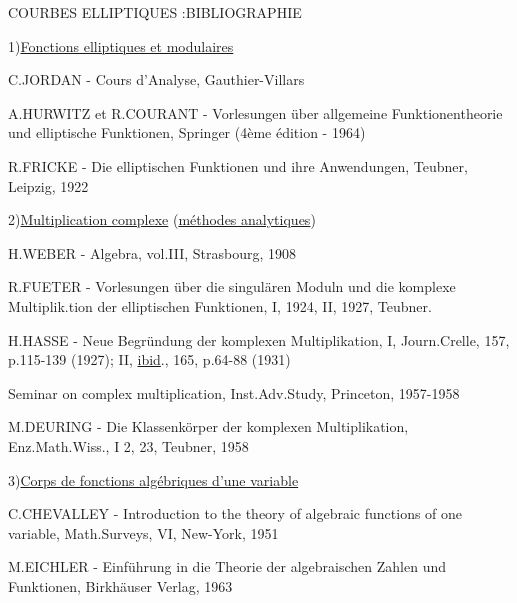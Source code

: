 \clearpage
{}
\reversemarginpar
{}
\normalmarginpar
{}

\begin{center}
COURBES ELLIPTIQUES :\quad BIBLIOGRAPHIE
\end{center}

1)\quad \uline{Fonctions elliptiques et modulaires}

C.JORDAN - Cours d'Analyse, Gauthier-Villars

A.HURWITZ et R.COURANT - Vorlesungen über allgemeine Funktionentheorie und elliptische Funktionen, Springer (4ème édition - 1964)

R.FRICKE - Die elliptischen Funktionen und ihre Anwendungen, Teubner, Leipzig, 1922

2)\quad \uline{Multiplication complexe} (\uline{méthodes analytiques})

H.WEBER - Algebra, vol.III, Strasbourg, 1908

R.FUETER - Vorlesungen über die singulären Moduln und die komplexe Multiplik.tion der elliptischen Funktionen, I, 1924, II, 1927, Teubner.

H.HASSE - Neue Begründung der komplexen Multiplikation, I, Journ.Crelle, 157, p.115-139 (1927); II, \uline{ibid}., 165, p.64-88 (1931)

Seminar on complex multiplication, Inst.Adv.Study, Princeton, 1957-1958

M.DEURING - Die Klassenkörper der komplexen Multiplikation, Enz.Math.Wiss., I 2, 23, Teubner, 1958

3)\quad \uline{Corps de fonctions algébriques d'une variable}

C.CHEVALLEY - Introduction to the theory of algebraic functions of one variable, Math.Surveys, VI, New-York, 1951

M.EICHLER - Einführung in die Theorie der algebraischen Zahlen und Funktionen, Birkhäuser Verlag, 1963
